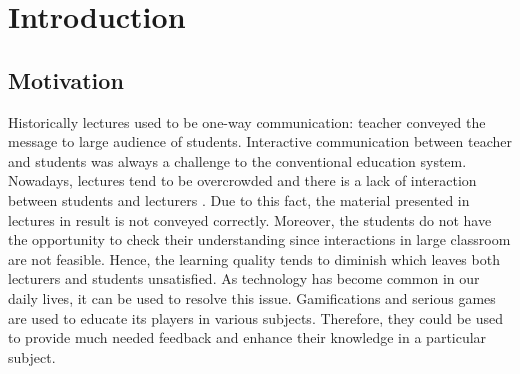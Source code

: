\documentclass{l4proj}
\begin{document}
%
%
%
%
%
%
%
%
\chapter{Introduction} \label{sec:Introduction}



\section{Motivation}

Historically lectures used to be one-way communication: teacher conveyed the message to large audience of students.
Interactive communication between teacher and students was always a challenge to the conventional education system.
Nowadays, lectures tend to be overcrowded and there is a lack of interaction between students and lecturers \citep{lehmann_theory-driven_2014}.
Due to this fact, the material presented in lectures in result is not conveyed correctly.
Moreover, the students do not have the opportunity to check their understanding since interactions in large classroom are not feasible.
Hence, the learning quality tends to diminish which leaves both lecturers and students unsatisfied.
As technology has become common in our daily lives, it can be used to resolve this issue.
Gamifications and serious games are used to educate its players in various subjects.
Therefore, they could be used to provide much needed feedback and enhance their knowledge in a particular subject.
\end{document}
